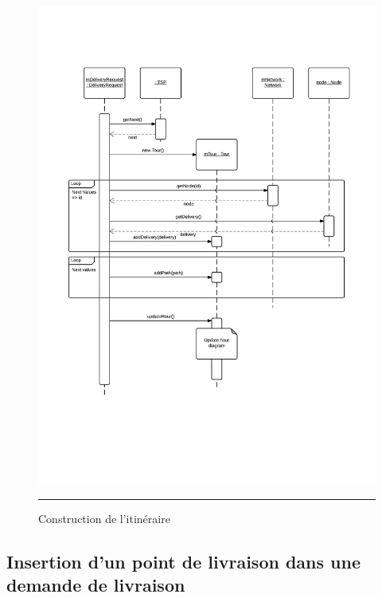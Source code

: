 \begin{figure}[H]
	\centering
		\includegraphics[width=\textwidth,height=\textheight,keepaspectratio]{Figures/calcul_tournee4}
		\rule{35em}{0.5pt}
	\caption[Construction de l'itinéraire]{Construction de l'itinéraire}
\end{figure}
\clearpage



\subsection{Insertion d'un point de livraison dans une demande de livraison}


